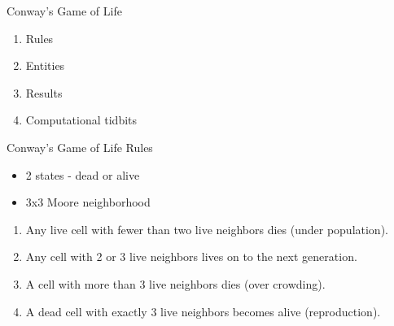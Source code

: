 \documentclass[bigger]{beamer}
\begin{document}
\begin{frame}[label=sec-15]{Conway's Game of Life}
\begin{enumerate}
\item<1->Rules
\item<2->Entities
\item<3->Results
\item<4->Computational tidbits
\end{enumerate}
\end{frame}

\begin{frame}[label=sec-16]{Conway's Game of Life Rules}
\begin{itemize}
\item<1->2 states - dead or alive
\item<2->3x3 Moore neighborhood 
\end{itemize}

\begin{enumerate}
\item<3->Any live cell with fewer than two live neighbors dies (under population).
\item<4->Any cell with 2 or 3 live neighbors lives on to the next generation.
\item<5->A cell with more than 3 live neighbors dies (over crowding).
\item<6->A dead cell with exactly 3 live neighbors becomes alive (reproduction).
\end{enumerate}
\end{frame}
\end{document}
